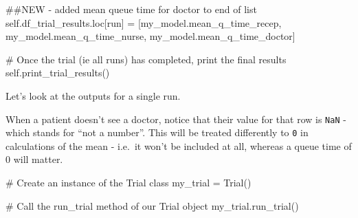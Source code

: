 \documentclass[
  letterpaper,
  DIV=11,
  numbers=noendperiod]{scrreprt}
\newenvironment{Shaded}{}{}
\newcommand{\CommentTok}[1]{\textcolor[rgb]{0.42,0.45,0.49}{#1}}
\newcommand{\NormalTok}[1]{\textcolor[rgb]{0.14,0.16,0.18}{#1}}
\newcommand{\OperatorTok}[1]{\textcolor[rgb]{0.14,0.16,0.18}{#1}}
\newcommand{\VariableTok}[1]{\textcolor[rgb]{0.89,0.38,0.04}{#1}}
\begin{document}
\begin{tcolorbox}
\begin{Shaded}
\begin{Highlighting}[]
            \CommentTok{\#\#NEW {-} added mean queue time for doctor to end of list}
            \VariableTok{self}\NormalTok{.df\_trial\_results.loc[run] }\OperatorTok{=}\NormalTok{ [my\_model.mean\_q\_time\_recep,}
\NormalTok{                                              my\_model.mean\_q\_time\_nurse,}
\NormalTok{                                              my\_model.mean\_q\_time\_doctor]}

        \CommentTok{\# Once the trial (ie all runs) has completed, print the final results}
        \VariableTok{self}\NormalTok{.print\_trial\_results()}
\end{Highlighting}
\end{Shaded}

\end{tcolorbox}

Let's look at the outputs for a single run.

When a patient doesn't see a doctor, notice that their value for that
row is \texttt{NaN} - which stands for ``not a number''. This will be
treated differently to \texttt{0} in calculations of the mean - i.e.~it
won't be included at all, whereas a queue time of 0 will matter.

\begin{Shaded}
\begin{Highlighting}[]
\CommentTok{\# Create an instance of the Trial class}
\NormalTok{my\_trial }\OperatorTok{=}\NormalTok{ Trial()}

\CommentTok{\# Call the run\_trial method of our Trial object}
\NormalTok{my\_trial.run\_trial()}
\end{Highlighting}
\end{Shaded}
\end{document}
